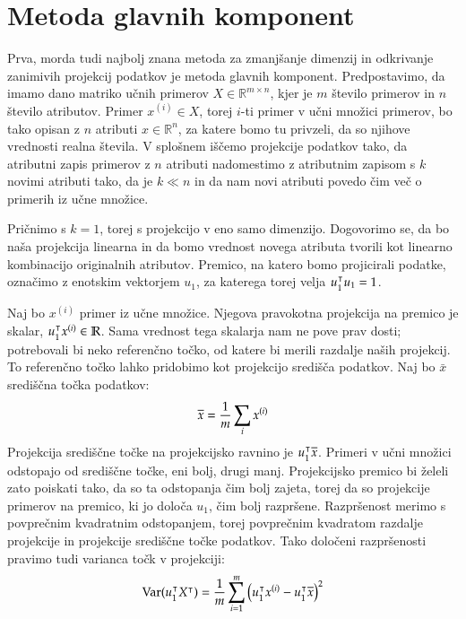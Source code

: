\begin{figure}[htbp]
\end{figure}

\section{Metoda glavnih komponent}

Prva, morda tudi najbolj znana metoda za zmanjšanje dimenzij in odkrivanje zanimivih projekcij podatkov je metoda glavnih komponent. Predpostavimo, da imamo dano matriko učnih primerov $X\in\mathbb{R}^{m\times n}$, kjer je $m$ število primerov in $n$ število atributov. Primer $x^{(i)}\in X$, torej $i$-ti primer v učni množici primerov, bo tako opisan z $n$ atributi $x\in\mathbb{R}^{n}$, za katere bomo tu privzeli, da so njihove vrednosti realna števila. V splošnem iščemo projekcije podatkov tako, da atributni zapis primerov z $n$ atributi nadomestimo z atributnim zapisom s $k$ novimi atributi tako, da je $k\ll n$ in da nam novi atributi povedo čim več o primerih iz učne množice.

Pričnimo s $k=1$, torej s projekcijo v eno samo dimenzijo. Dogovorimo se, da bo naša projekcija linearna in da bomo vrednost novega atributa tvorili kot linearno kombinacijo originalnih atributov. Premico, na katero bomo projicirali podatke, označimo z enotskim vektorjem $u_1$, za katerega torej velja $u_1^\intercal u_1=1$.

Naj bo $x^{(i)}$ primer iz učne množice. Njegova pravokotna projekcija na premico je skalar, $u_1^\intercal x^{(i)}\in \mathbb{R}$. Sama vrednost tega skalarja nam ne pove prav dosti; potrebovali bi neko referenčno točko, od katere bi merili razdalje naših projekcij. To referenčno točko lahko pridobimo kot projekcijo središča podatkov. Naj bo $\bar{x}$ središčna točka podatkov:
%
$$ \overline{x}=\frac{1}{m}\sum_i x^{(i)}$$
%
Projekcija središčne točke na projekcijsko ravnino je $u_1^\intercal \overline{x}$. Primeri v učni množici odstopajo od središčne točke, eni bolj, drugi manj. Projekcijsko premico bi želeli zato poiskati tako, da so ta odstopanja čim bolj zajeta, torej da so projekcije primerov na premico, ki jo določa $u_1$, čim bolj razpršene. Razpršenost merimo s povprečnim kvadratnim odstopanjem, torej povprečnim kvadratom razdalje projekcije in projekcije središčne točke podatkov. Tako določeni razpršenosti pravimo tudi varianca točk v projekciji:
%
$$ \mathrm{Var}(u_1^\intercal X^\intercal)=\frac{1}{m}\sum_{i=1}^m \big(u_1^\intercal x^{(i)}-u_1^\intercal\overline{x}\big)^2 $$

